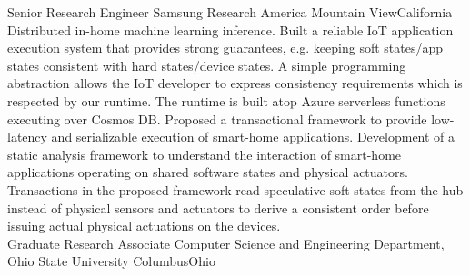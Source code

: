 \documentclass[10pt,a4paper,roman]{moderncv}
\begin{document}
{Senior Research Engineer}
{Samsung Research America}
{Mountain View}{California}
{}
\cvline{--} Distributed in-home machine learning inference.
\cvline{--}
{Built a reliable IoT application execution system that provides strong guarantees, e.g. keeping soft states/app states consistent with hard states/device states.
 A simple programming abstraction allows the IoT developer to express consistency requirements which is respected by our runtime. The runtime is built atop Azure serverless functions
 executing over Cosmos DB.}
\cvline{--}
{Proposed a transactional framework to provide low-latency and serializable execution of smart-home applications. Development of a static analysis framework to understand the interaction
of smart-home applications operating on shared software states and physical actuators. Transactions in the proposed framework read speculative soft states from the hub instead of physical sensors
and actuators to derive a consistent order before issuing actual physical actuations on the devices.}
\\
{Graduate Research Associate}
{Computer Science and Engineering Department, Ohio State University}
{Columbus}{Ohio}{}
\end{document}
